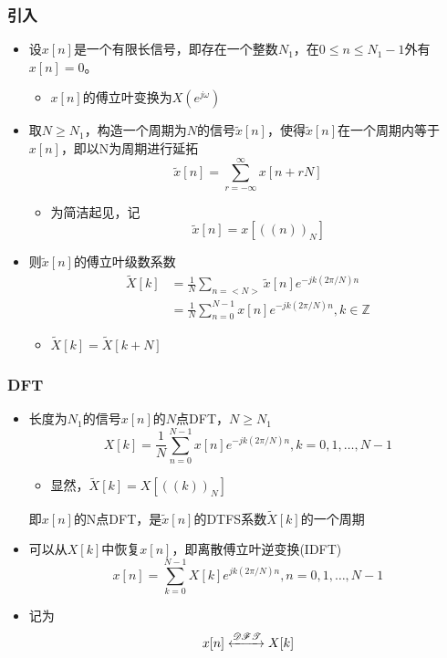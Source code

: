 \documentclass[CJKutf8,xcolor=pdftex,dvipsnames,table]{beamer}
\begin{document}
\begin{CJK*}{UTF8}{song}
  \begin{frame}
    \frametitle{引入}
    \begin{itemize}
    \item 设$x[n]$是一个有限长信号，即存在一个整数$N_1$，在$0\leq n \leq N_1 - 1$外有$x[n]=0$。
    	\begin{itemize}
    	\item $x[n]$的傅立叶变换为$X(e^{j\omega})$
    	\end{itemize}
	\item 取$N\geq N_1$，构造一个周期为$N$的信号$\tilde{x}[n]$，使得$\tilde{x}[n]$在一个周期内等于$x[n]$，即以N为周期进行延拓
		\[
			\tilde{x}[n]=\sum_{r=-\infty}^{\infty} x[n+rN]
		\]
		\begin{itemize}
		\item 为简洁起见，记
		\[
			\tilde{x}[n]=x[((n))_N]
		\]
		\end{itemize}
	\item 则$\tilde{x}[n]$的傅立叶级数系数
		\begin{align*}
			\tilde{X}[k] & = \frac{1}{N}\sum_{n=<N>} \tilde{x}[n] e^{-jk(2\pi/N)n} \\
		    	& = \frac{1}{N}\sum_{n=0}^{N-1} x[n] e^{-jk(2\pi/N)n}, k \in \mathbb{Z}
		\end{align*}
		\begin{itemize}
		\item $\tilde{X}[k]=\tilde{X}[k+N]$
		\end{itemize}
    \end{itemize}
  \end{frame} 	

  \begin{frame}
    \frametitle{DFT}
    \begin{itemize}
	\item 长度为$N_1$的信号$x[n]$的$N$点DFT，$N \geq N_1$
		\[
			X[k] = \frac{1}{N}\sum_{n=0}^{N-1} x[n] e^{-jk(2\pi/N)n}, k=0, 1, \hdots, N-1
		\]
		\begin{itemize}
		\item 显然，$\tilde{X}[k]=X[((k))_N]$
		\end{itemize}
	{\color{red}即$x[n]$的N点DFT，是$\tilde{x}[n]$的DTFS系数$\tilde{X}[k]$的一个周期}
	\item 可以从$X[k]$中恢复$x[n]$，即离散傅立叶逆变换(IDFT)
		\[
			x[n] = \sum_{k=0}^{N-1} X[k] e^{jk(2\pi/N)n}, n=0, 1, \hdots, N-1
		\]
	\item 记为
		\[
			x[n] \xleftrightarrow{\mathscr{DFT}} X[k]
		\]		
    \end{itemize}
  \end{frame} 	
	

\end{CJK*}
\end{document}
